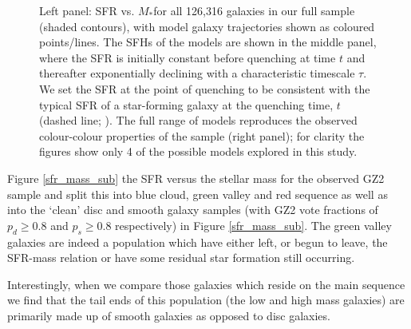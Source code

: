 \documentclass[useAMS,usenatbib]{mn2e}
\begin{document}
\begin{figure}
\caption{Left panel: SFR vs. $M_*$for all 126,316 galaxies in our full sample (shaded contours), with model galaxy trajectories shown as coloured points/lines. The SFHs of the models are shown in the middle panel, where the SFR is initially constant before quenching at time $t$ and thereafter exponentially declining with a characteristic timescale $\tau$. We set the SFR at the point of quenching to be consistent with the typical SFR of a star-forming galaxy at the quenching time, $t$ (dashed line; \citealt{Peng}). The full range of models reproduces the observed colour-colour properties of the sample (right panel); for clarity the figures show only 4 of the possible models explored in this study.}
\label{sfr_mass_col}
\end{figure}


Figure \ref{sfr_mass_sub} the SFR versus the stellar mass for the observed GZ2 sample and split this into blue cloud, green valley and red sequence as well as into the `clean' disc and smooth galaxy samples (with GZ2 vote fractions of $p_d \geq 0.8$ and $p_s \geq 0.8$ respectively) in Figure \ref{sfr_mass_sub}. The green valley galaxies are indeed a population which have either left, or begun to leave, the SFR-mass relation or have some residual star formation still occurring. 

Interestingly, when we compare those galaxies which reside on the main sequence we find that the tail ends of this population (the low and high mass  galaxies) are primarily made up of smooth galaxies as opposed to disc galaxies.

\end{document}
